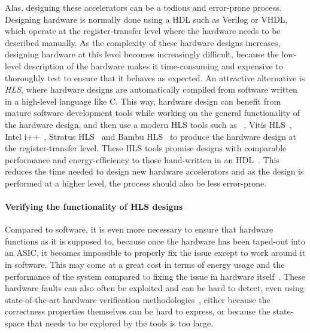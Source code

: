 Alas, designing these accelerators can be a tedious and error-prone process.
Designing hardware is normally done using a \gls{HDL} such as Verilog or VHDL,
which operate at the register-transfer level where the hardware needs to be
described manually.  As the complexity of these hardware designs increases,
designing hardware at this level becomes increasingly difficult, because the
low-level description of the hardware makes it time-consuming and expensive to
thoroughly test to ensure that it behaves as expected.  An attractive
alternative is \emph{\gls{HLS}}, where hardware designs are automatically
compiled from software written in a high-level language like C.  This way,
hardware design can benefit from mature software development tools while working
on the general functionality of the hardware design, and then use a modern
\gls{HLS} tools such as \legup{}~\cite{canis13_l}, Vitis
HLS~\cite{amd23_vitis_high_synth}, Intel i++~\cite{intel20_hsc}, Stratus
HLS~\cite{roane23_autom_hw_sw_co_desig} and Bambu HLS~\cite{pilato13_bambu} to
produce the hardware design at the register-transfer level.  These \gls{HLS}
tools promise designs with comparable performance and energy-efficiency to those
hand-written in an \gls{HDL}~\cite{homsirikamol14_can,
  gauthier20_high_level_synth, pelcat16_desig_hdl}.  This reduces the time
needed to design new hardware accelerators and as the design is performed at a
higher level, the process should also be less error-prone.

\paragraph{Verifying the functionality of HLS designs} Compared to software, it
is even more necessary to ensure that hardware functions as it is supposed to,
because once the hardware has been taped-out into an \gls{ASIC}, it becomes
impossible to properly fix the issue except to work around it in software.  This
may come at a great cost in terms of energy usage and the performance of the
system compared to fixing the issue in hardware
itself~\cite{herzog21_price_meltd_spect,
  bowen20_perfor_cost_softw_based_secur_mitig}.  These hardware faults can also
often be exploited and can be hard to detect, even using state-of-the-art
hardware verification methodologies~\cite{dessouky19_hardf}, either because the
correctness properties themselves can be hard to express, or because the
state-space that needs to be explored by the tools is too large.

